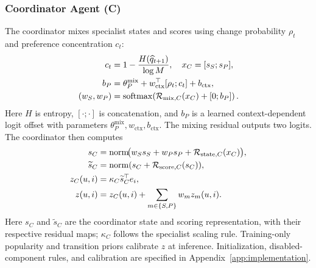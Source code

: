 ﻿\documentclass[sigconf,anonymous,review]{acmart}
\newcommand{\norm}[1]{\operatorname{norm}(#1)}
\newcommand{\softmax}{\operatorname{softmax}}
\begin{document}
\subsubsection{Coordinator Agent (C)}
The coordinator mixes specialist states and scores using change probability $\rho_t$ and preference concentration $c_t$:
\begin{align}
 c_t&=1-\frac{H(\widehat q_{t+1})}{\log M},\quad x_C=[s_S;s_P],\notag\\
 b_P&=\theta_P^{\mathrm{mix}}+w_{\mathrm{ctx}}^\top[\rho_t;c_t]+b_{\mathrm{ctx}},\notag\\
 (w_S,w_P)&=\softmax\!\left(\mathcal R_{\mathrm{mix},C}(x_C)+[0;b_P]\right).
\end{align}
Here $H$ is entropy, $[\cdot;\cdot]$ is concatenation, and $b_P$ is a learned context-dependent logit offset with parameters $\theta_P^{\mathrm{mix}},w_{\mathrm{ctx}},b_{\mathrm{ctx}}$. The mixing residual outputs two logits. The coordinator then computes
\begin{align}
 s_C&=\operatorname{norm}\!\bigl(w_Ss_S+w_Ps_P+\mathcal R_{\mathrm{state},C}(x_C)\bigr),\notag\\
 \widetilde s_C&=\norm{s_C+\mathcal R_{\mathrm{score},C}(s_C)},\notag\\
 z_C(u,i)&=\kappa_C\widetilde s_C^\top e_i,\notag\\
 z(u,i)&=z_C(u,i)+\sum_{m\in\{S,P\}}w_m z_m(u,i).
\end{align}
Here $s_C$ and $\widetilde s_C$ are the coordinator state and scoring representation, with their respective residual maps; $\kappa_C$ follows the specialist scaling rule. Training-only popularity and transition priors calibrate $z$ at inference. Initialization, disabled-component rules, and calibration are specified in Appendix~\ref{app:implementation}.
\end{document}
